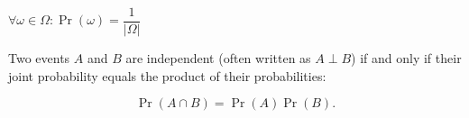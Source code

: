 \begin{defn}
	$ \forall \omega \in \Omega : \Pr(\omega) = \dfrac{1}{|\Omega|} $
\end{defn}

\begin{defn}
Two events $ A $ and $ B $ are independent (often written as $ A \perp B  $) if and only if their joint probability equals the product of their probabilities:

\[ \Pr{(A \cap B)} = \Pr{(A)}\Pr{(B)}. \]
\end{defn} 

\begin{notation}
\end{notation}
	